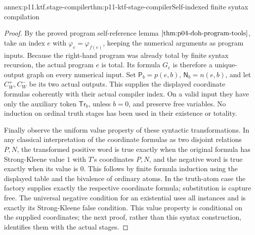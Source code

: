 \begin{annexitem}{annex:p11.ktf.stage-compiler}{thm:p11-ktf-stage-compiler}{Self-indexed finite syntax compilation}
\begin{proof}
By the proved program self-reference lemma
\(\ref{thm:p04-doh-program-tools}\), take an index \(e\)
with \(\varphi_e=\varphi_{f(e)}\), keeping the numerical
arguments as program inputs. Because the right-hand program was
already total by finite syntax recursion, the actual program \(e\)
is total. Its formula \(G_e\) is therefore a unique-output
graph on every numerical input. Set \(\mathsf P_b=p(e,b)\),
\(\mathsf N_b=n(e,b)\), and let \(C_W^+,C_W^-\)
be its two actual outputs. This supplies the displayed coordinate
formulas coherently with their actual compiler index. On a valid
input they have only the auxiliary token \(\mathsf{Tr}_b\),
unless \(b=0\), and preserve free variables. No induction
on ordinal truth stages has been used in their existence or totality.

Finally observe the uniform value property of these syntactic
transformations. In any classical interpretation of the coordinate
formulas as two disjoint relations \(P,N\), the transformed
positive word is true exactly when the original formula has Strong-Kleene
value \(1\) with \(T\)'s coordinates \(P,N\), and
the negative word is true exactly when its value is \(0\).
This follows by finite formula induction using the displayed table
and the bivalence of ordinary atoms. In the truth-atom case
the factory supplies exactly the respective coordinate formula;
substitution is capture free. The universal negative condition
for an existential uses all instances and is exactly its Strong-Kleene
false condition. This value property is conditional on the supplied
coordinates; the next proof, rather than this syntax construction,
identifies them with the actual stages.
\end{proof}
\end{annexitem}

